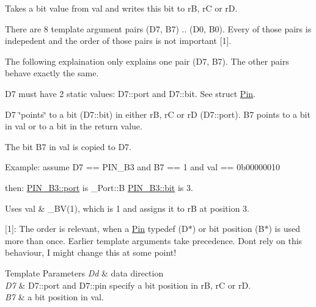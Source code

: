 Takes a bit value from {\ttfamily val} and writes this bit to {\ttfamily rB}, {\ttfamily rC} or {\ttfamily rD}. 

There are 8 template argument pairs (D7, B7) .. (D0, B0). Every of those pairs is indepedent and the order of those pairs is not important \mbox{[}1\mbox{]}.

The following explaination only explains one pair (D7, B7). The other pairs behave exactly the same.

{\ttfamily D7} must have 2 static values\+: {\ttfamily D7\+::port} and {\ttfamily D7\+::bit}. See struct \hyperlink{structports_1_1Pin}{Pin}.

{\ttfamily D7} \char`\"{}points\char`\"{} to a bit ({\ttfamily D7\+::bit}) in either {\ttfamily rB}, {\ttfamily rC} or {\ttfamily rD} ({\ttfamily D7\+::port}). {\ttfamily B7} points to a bit in {\ttfamily val} or to a bit in the return value.

The bit {\ttfamily B7} in {\ttfamily val} is copied to {\ttfamily D7}.

Example\+: assume {\ttfamily D7 == P\+I\+N\+\_\+\+B3} and {\ttfamily B7 == 1} and {\ttfamily val == 0b00000010}

then\+: {\ttfamily \hyperlink{structports_1_1Pin_ad63613b8c14441d28e3f3d935da67e77}{P\+I\+N\+\_\+\+B3\+::port}} is {\ttfamily \+\_\+\+Port\+::B} {\ttfamily \hyperlink{structports_1_1Pin_aea726b85cfe5e49822dd2517da5c860f}{P\+I\+N\+\_\+\+B3\+::bit}} is 3.

Uses {\ttfamily val \& \+\_\+\+B\+V(1)}, which is 1 and assigns it to {\ttfamily rB} at position 3.

\mbox{[}1\mbox{]}\+: The order is relevant, when a \hyperlink{structports_1_1Pin}{Pin} {\ttfamily typedef} (D$\ast$) or bit position (B$\ast$) is used more than once. Earlier template arguments take precedence. Don\textquotesingle{}t rely on this behaviour, I might change this at some point!


\begin{DoxyTemplParams}{Template Parameters}
{\em Dd} & data direction \\
\hline
{\em D7} & {\ttfamily D7\+::port} and {\ttfamily D7\+::pin} specify a bit position in {\ttfamily rB}, {\ttfamily rC} or {\ttfamily rD}. \\
\hline
{\em B7} & a bit position in {\ttfamily val}. \\
\hline
\end{DoxyTemplParams}

